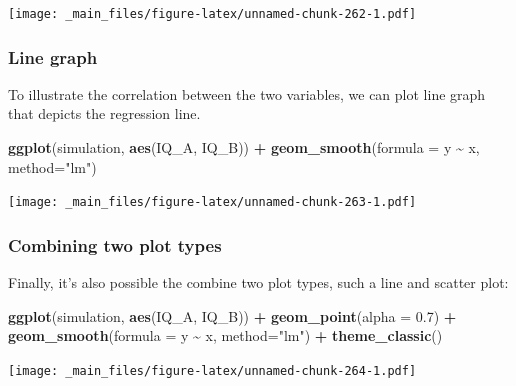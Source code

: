 \documentclass[
]{scrartcl}
\newenvironment{Shaded}{\begin{snugshade}}{\end{snugshade}}
\newcommand{\DataTypeTok}[1]{\textcolor[rgb]{0.13,0.29,0.53}{#1}}
\newcommand{\FloatTok}[1]{\textcolor[rgb]{0.00,0.00,0.81}{#1}}
\newcommand{\KeywordTok}[1]{\textcolor[rgb]{0.13,0.29,0.53}{\textbf{#1}}}
\newcommand{\NormalTok}[1]{#1}
\newcommand{\OperatorTok}[1]{\textcolor[rgb]{0.81,0.36,0.00}{\textbf{#1}}}
\newcommand{\StringTok}[1]{\textcolor[rgb]{0.31,0.60,0.02}{#1}}
\begin{document}
\texttt{[image: \_main\_files/figure-latex/unnamed-chunk-262-1.pdf]}

\hypertarget{line-graph}{%
\subsubsection{Line graph}\label{line-graph}}

To illustrate the correlation between the two variables, we can plot line graph that depicts the regression line.

\begin{Shaded}
\begin{Highlighting}[]
\KeywordTok{ggplot}\NormalTok{(simulation, }\KeywordTok{aes}\NormalTok{(IQ\_A, IQ\_B)) }\OperatorTok{+}
\StringTok{  }\KeywordTok{geom\_smooth}\NormalTok{(}\DataTypeTok{formula =}\NormalTok{ y }\OperatorTok{\textasciitilde{}}\StringTok{ }\NormalTok{x, }\DataTypeTok{method=}\StringTok{"lm"}\NormalTok{)}
\end{Highlighting}
\end{Shaded}

\texttt{[image: \_main\_files/figure-latex/unnamed-chunk-263-1.pdf]}

\hypertarget{combining-two-plot-types}{%
\subsubsection{Combining two plot types}\label{combining-two-plot-types}}

Finally, it's also possible the combine two plot types, such a line and scatter plot:

\begin{Shaded}
\begin{Highlighting}[]
\KeywordTok{ggplot}\NormalTok{(simulation, }\KeywordTok{aes}\NormalTok{(IQ\_A, IQ\_B)) }\OperatorTok{+}
\StringTok{  }\KeywordTok{geom\_point}\NormalTok{(}\DataTypeTok{alpha =} \FloatTok{0.7}\NormalTok{) }\OperatorTok{+}
\StringTok{  }\KeywordTok{geom\_smooth}\NormalTok{(}\DataTypeTok{formula =}\NormalTok{ y }\OperatorTok{\textasciitilde{}}\StringTok{ }\NormalTok{x, }\DataTypeTok{method=}\StringTok{"lm"}\NormalTok{) }\OperatorTok{+}
\StringTok{  }\KeywordTok{theme\_classic}\NormalTok{()}
\end{Highlighting}
\end{Shaded}

\texttt{[image: \_main\_files/figure-latex/unnamed-chunk-264-1.pdf]}

\newpage

\hypertarget{appendix-appendix}{%
\appendix}
\end{document}
